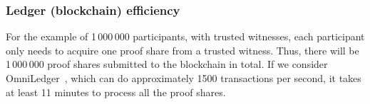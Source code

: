 \subsubsection{Ledger (blockchain) efficiency}

For the example of 1\,000\,000 participants, with trusted witnesses, each 
participant only needs to acquire one proof share from a trusted witness.
Thus, there will be 1\,000\,000 proof shares submitted to the blockchain in total.
If we consider OmniLedger~\cite{OmniLedger}, which can do approximately 1500 transactions per second, it takes at least 11 minutes to process all the proof shares.




